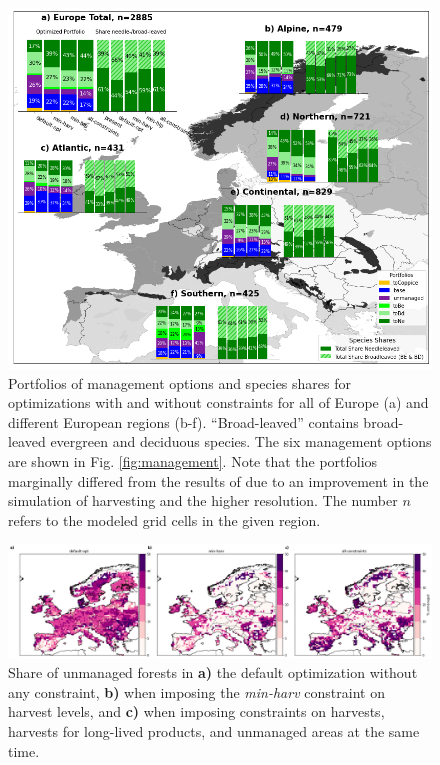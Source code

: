 \documentclass[]{article}
\begin{document}
\begin{figure}[h!]
	\centering
	\includegraphics[width=\linewidth]{paper_figs/compare_portfolios_europe_final_revision.png}
	\caption{Portfolios of management options and species shares for optimizations with and without constraints for all of Europe (a) and different European regions (b-f). ``Broad-leaved'' contains broad-leaved evergreen and deciduous species. The six management options are shown in Fig. \ref{fig:management}. Note that the portfolios marginally differed from the results of \textcite{Gregor2022} due to an improvement in the simulation of harvesting and the higher resolution. The number $n$ refers to the modeled grid cells in the given region.}
	\label{fig:portfolios-original-and-harv}
\end{figure}






\begin{figure}[h!]
	\centering
	\includegraphics[width=0.9\linewidth]{paper_figs/unmanaged_cells.png}
	\caption{Share of unmanaged forests in \textbf{a)} the default optimization without any constraint, \textbf{b)} when imposing the \textit{min-harv} constraint on harvest levels, and \textbf{c)} when imposing constraints on harvests, harvests for long-lived products, and unmanaged areas at the same time.}
	\label{fig:unmanaged-cells}
\end{figure}
\end{document}

